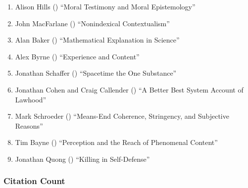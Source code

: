 \documentclass[
  10pt,
  letterpaper,
  DIV=11,
  numbers=noendperiod,
  twoside]{scrartcl}
\providecommand{\tightlist}{%
  \setlength{\itemsep}{0pt}\setlength{\parskip}{0pt}}\usepackage{longtable,booktabs,array}
\begin{document}
\begin{enumerate}
\def\labelenumi{\arabic{enumi}.}
\tightlist
\item
  Alison Hills () ``Moral
  Testimony and Moral Epistemology''
\item
  John MacFarlane ()
  ``Nonindexical Contextualism''
\item
  Alan Baker () ``Mathematical
  Explanation in Science''
\item
  Alex Byrne () ``Experience and
  Content''
\item
  Jonathan Schaffer ()
  ``Spacetime the One Substance''
\item
  Jonathan Cohen and Craig Callender
  () ``A Better Best System
  Account of Lawhood''
\item
  Mark Schroeder () ``Means-End
  Coherence, Stringency, and Subjective Reasons''
\item
  Tim Bayne () ``Perception and
  the Reach of Phenomenal Content''
\item
  Jonathan Quong () ``Killing in
  Self-Defense''
\end{enumerate}

\subsubsection*{Citation Count}\label{sec-count-2009}
\end{document}
